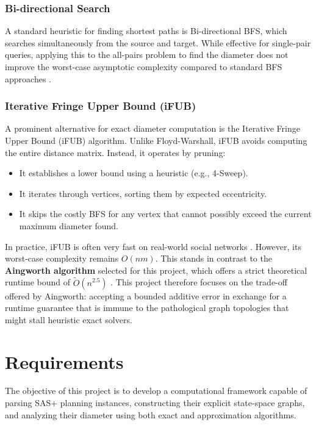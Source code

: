 \documentclass[12pt,a4paper]{report}
\begin{document}
\subsection*{Bi-directional Search}
A standard heuristic for finding shortest paths is Bi-directional BFS, which searches simultaneously from the source and target. While effective for single-pair queries, applying this to the all-pairs problem to find the diameter does not improve the worst-case asymptotic complexity compared to standard BFS approaches \cite{westGraphTheory}.

\subsection*{Iterative Fringe Upper Bound (iFUB)}
A prominent alternative for exact diameter computation is the Iterative Fringe Upper Bound (iFUB) algorithm. Unlike Floyd-Warshall, iFUB avoids computing the entire distance matrix. Instead, it operates by pruning:
\begin{itemize}
    \item It establishes a lower bound using a heuristic (e.g., 4-Sweep).
    \item It iterates through vertices, sorting them by expected eccentricity.
    \item It skips the costly BFS for any vertex that cannot possibly exceed the current maximum diameter found.
\end{itemize}
In practice, iFUB is often very fast on real-world social networks \cite{ifub}. However, its worst-case complexity remains $O(nm)$. This stands in contrast to the \textbf{Aingworth algorithm} selected for this project, which offers a strict theoretical runtime bound of $\tilde{O}(n^{2.5})$ \cite{aingworth96}. This project therefore focuses on the trade-off offered by Aingworth: accepting a bounded additive error in exchange for a runtime guarantee that is immune to the pathological graph topologies that might stall heuristic exact solvers.

\chapter{Requirements}
The objective of this project is to develop a computational framework capable of parsing SAS+ planning instances, constructing their explicit state-space graphs, and analyzing their diameter using both exact and approximation algorithms.
\end{document}
